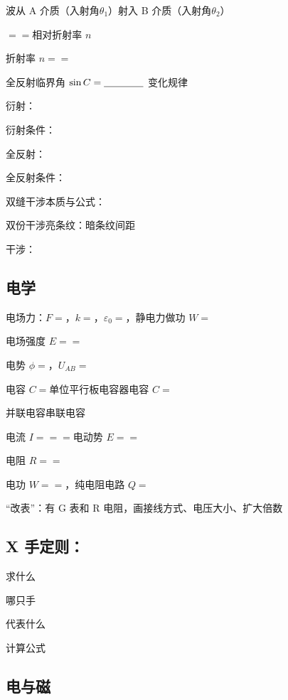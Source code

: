 波从 A 介质（入射角$\theta_1$）射入 B 介质（入射角$\theta_2$）

\mbl $=$\mbl $=$相对折射率 $n$

折射率 $n=$\mbl $=$\mbl

全反射临界角 $\sin C =\underline{\hspace{4em}} $ 变化规律\cxlb

衍射：

衍射条件：

全反射：

全反射条件：

双缝干涉本质与公式：

双份干涉亮条纹：\lbl \quad 暗条纹\clb  \quad 间距\clb

干涉：


\subsection{电学}


电场力：$F=$\sbl ，$k=$\sbl \esb，$\varepsilon_0=$\sbl ，静电力做功 $W=$\sbl

电场强度 $E=$\sbl $=$\sbl

电势 $\phi=$\sbl ，$U_{AB}=$\sbl

电容 $C=$\sbl 单位\cmb \quad 平行板电容器电容 $C=$\sbl

并联电容\sbl \quad 串联电容\sbl

电流 $I=$\sbl $=$\sbl $=$\sbl \quad 电动势 $E=$\sbl $=$\sbl

电阻 $R=$\sbl $=$\sbl

电功 $W=$\sbl $=$\sbl ，纯电阻电路 $Q=$\sbl

“改表”：有 G 表和 R 电阻，画接线方式、电压大小、扩大倍数


\subsection{X 手定则：}


求什么

哪只手

代表什么

计算公式 

\subsection{电与磁}

